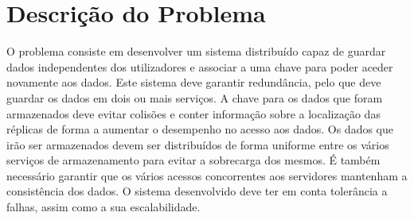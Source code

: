 \chapter{Descrição do Problema}

O problema consiste em desenvolver um sistema distribuído capaz de guardar dados independentes dos utilizadores e associar a uma chave para poder aceder novamente aos dados. Este sistema deve garantir redundância, pelo que deve guardar os dados em dois ou mais serviços. A chave para os dados que foram armazenados deve evitar colisões e conter informação sobre a localização das réplicas de forma a aumentar o desempenho no acesso aos dados. Os dados que irão ser armazenados devem ser distribuídos de forma uniforme entre os vários serviços de armazenamento para evitar a sobrecarga dos mesmos. É também necessário garantir que os vários acessos concorrentes aos servidores mantenham a consistência dos dados. O sistema desenvolvido deve ter em conta tolerância a falhas, assim como a sua escalabilidade.